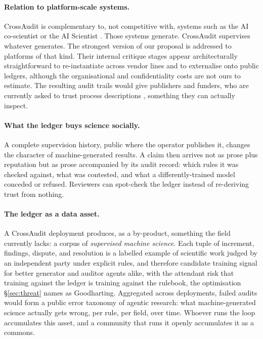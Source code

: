 \documentclass[11pt,letterpaper]{article}
\begin{document}
\paragraph{Relation to platform-scale systems.} CrossAudit is complementary to, not competitive with, systems such as the AI co-scientist \cite{gottweis2025coscientist} or the AI Scientist \cite{lu2026nature}. Those systems generate. CrossAudit supervises whatever generates. The strongest version of our proposal is addressed to platforms of that kind. Their internal critique stages appear architecturally straightforward to re-instantiate across vendor lines and to externalise onto public ledgers, although the organisational and confidentiality costs are not ours to estimate. The resulting audit trails would give publishers and funders, who are currently asked to trust process descriptions \cite{naturenews2026}, something they can actually inspect.

\paragraph{What the ledger buys science socially.} A complete supervision history, public where the operator publishes it, changes the character of machine-generated results. A claim then arrives not as prose plus reputation but as prose accompanied by its audit record: which rules it was checked against, what was contested, and what a differently-trained model conceded or refused. Reviewers can spot-check the ledger instead of re-deriving trust from nothing.

\paragraph{The ledger as a data asset.} A CrossAudit deployment produces, as a by-product, something the field currently lacks: a corpus of \emph{supervised machine science}. Each tuple of increment, findings, dispute, and resolution is a labelled example of scientific work judged by an independent party under explicit rules, and therefore candidate training signal for better generator and auditor agents alike, with the attendant risk that training against the ledger is training against the rulebook, the optimisation \S\ref{sec:threat} names as Goodharting. Aggregated across deployments, failed audits would form a public error taxonomy of agentic research: what machine-generated science actually gets wrong, per rule, per field, over time. Whoever runs the loop accumulates this asset, and a community that runs it openly accumulates it as a commons.
\end{document}
